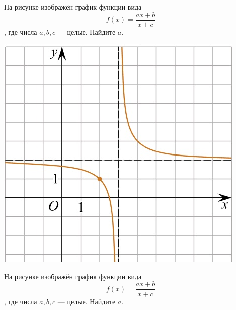 \begin{class}[number=5]
\begin{listofex}
\begin{minipage}[t]{0.22\textwidth}
		\end{minipage}
		\item
		\begin{minipage}[t]{0.66\textwidth}
			На рисунке изображён график функции вида \[ f(x)=\dfrac{ax+b}{x+c} \], где числа \(a, b, c\) --- целые. Найдите \(a\).
		\end{minipage}
		\hspace{0.05\textwidth}
		\begin{minipage}[t]{0.22\textwidth}
			\includegraphics[align=t, width=\textwidth]{pics/G101M4C5-4.jpg}
		\end{minipage}
		\item
		\begin{minipage}[t]{0.66\textwidth}
			На рисунке изображён график функции вида \[ f(x)=\dfrac{ax+b}{x+c} \], где числа \(a, b, c\) --- целые. Найдите \(a\).
		\end{minipage}
		\hspace{0.05\textwidth}
		\begin{minipage}[t]{0.22\textwidth}

\end{minipage}
\end{listofex}
\end{class}
